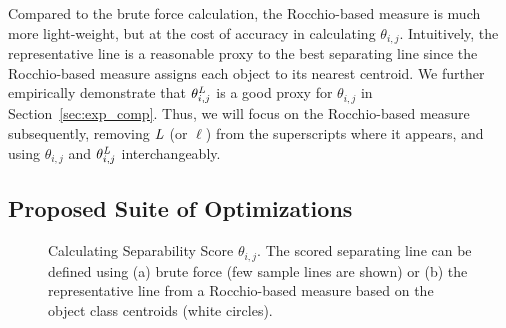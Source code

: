  Compared to the brute force calculation, the Rocchio-based measure is much more light-weight, but at the cost of accuracy in calculating $\theta_{i,j}$. Intuitively, the representative line is a reasonable proxy to the best separating line since the Rocchio-based measure assigns each object to its nearest centroid. We further empirically demonstrate that $\theta_{i,j}^{\mathit{L}}$ is a good proxy for $\theta_{i,j}$ in Section~\ref{sec:exp_comp}. Thus, we will focus on the Rocchio-based measure subsequently, removing $\mathit{L}$ (or $\ell$) from the superscripts where it appears, and using $\theta_{i,j}$ and $\theta_{i,j}^{\mathit{L}}$ interchangeably.


\subsection{Proposed Suite of Optimizations}\label{sec:opt}


\begin{figure}[t!]
\centering %
\vspace{-2mm}
\vspace{-5mm}
\caption{Calculating Separability Score $\theta_{i,j}$. The scored separating line can be defined using (a) brute force (few sample lines are shown) or (b) the representative line from a Rocchio-based measure based on the object class centroids (white circles).}
\vspace{-5mm}
\label{fig:metric}
\end{figure}

